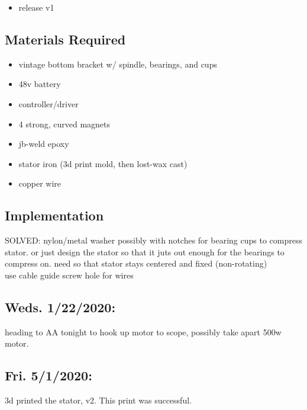 \documentclass[11pt]{article} %
\begin{document}
\vspace{5mm}

\begin{itemize}
\item release v1
\end{itemize}

\subsection*{Materials Required}

\begin{itemize}
\item vintage bottom bracket w/ spindle, bearings, and cups
\item 48v battery
\item controller/driver
\item 4 strong, curved magnets
\item jb-weld epoxy
\item stator iron (3d print mold, then lost-wax cast)
\item copper wire
\end{itemize}

\subsection*{Implementation}

\noindent SOLVED: nylon/metal washer possibly with notches for bearing cups to compress stator. or just design the stator so that it juts out enough for the bearings to compress on. need so that stator stays centered and fixed (non-rotating) \\

\noindent use cable guide screw hole for wires \\


\subsection*{Weds. 1/22/2020:} heading to AA tonight to hook up motor to scope, possibly take apart 500w motor.

\subsection*{Fri. 5/1/2020:} 3d printed the stator, v2. This print was successful.
\end{document}
